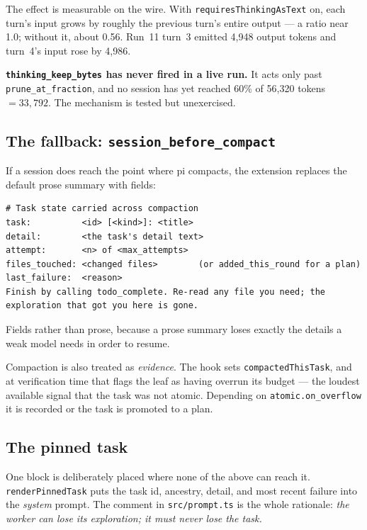 \documentclass[11pt,a4paper]{article}
\newcommand{\file}[1]{\texttt{#1}}
\newcommand{\key}[1]{\texttt{#1}}
\begin{document}
The effect is measurable on the wire. With \key{requiresThinkingAsText} on, each
turn's input grows by roughly the previous turn's entire output --- a ratio near
1.0; without it, about 0.56. Run~11 turn~3 emitted 4{,}948 output tokens and
turn~4's input rose by 4{,}986.

\textbf{\key{thinking\_keep\_bytes} has never fired in a live run.} It acts only
past \key{prune\_at\_fraction}, and no session has yet reached 60\% of 56{,}320
tokens $= 33{,}792$. The mechanism is tested but unexercised.

\subsection{The fallback: \texttt{session\_before\_compact}}

If a session does reach the point where pi compacts, the extension replaces the
default prose summary with fields:

\begin{lstlisting}
# Task state carried across compaction
task:          <id> [<kind>]: <title>
detail:        <the task's detail text>
attempt:       <n> of <max_attempts>
files_touched: <changed files>        (or added_this_round for a plan)
last_failure:  <reason>
Finish by calling todo_complete. Re-read any file you need; the
exploration that got you here is gone.
\end{lstlisting}

Fields rather than prose, because a prose summary loses exactly the details a
weak model needs in order to resume.

Compaction is also treated as \emph{evidence}. The hook sets
\file{compactedThisTask}, and at verification time that flags the leaf as having
overrun its budget --- the loudest available signal that the task was not atomic.
Depending on \key{atomic.on\_overflow} it is recorded or the task is promoted to
a plan.

\subsection{The pinned task}

One block is deliberately placed where none of the above can reach it.
\file{renderPinnedTask} puts the task id, ancestry, detail, and most recent
failure into the \emph{system} prompt. The comment in \file{src/prompt.ts} is
the whole rationale: \emph{the worker can lose its exploration; it must never
lose the task.}
\end{document}
